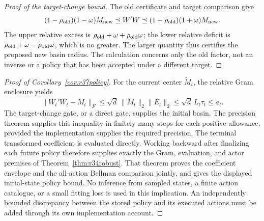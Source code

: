 \documentclass[ecta,nameyear,draft]{econsocart}
\theoremstyle{definition}
\theoremstyle{remark}
\begin{document}
\begin{proof}[Proof of the target-change bound]
The old certificate and target comparison give
\[
 (1-\rho_{\rm old})(1-\omega)M_{\rm new}
 \preceq W'W\preceq
 (1+\rho_{\rm old})(1+\omega)M_{\rm new}.
\]
The upper relative excess is $\rho_{\rm old}+\omega+
\rho_{\rm old}\omega$; the lower relative deficit is
$\rho_{\rm old}+\omega-\rho_{\rm old}\omega$, which is no greater.
The larger quantity thus certifies the proposed new basin radius. The
calculation concerns only the old factor, not an inverse or a policy that
has been accepted under a different target.
\end{proof}

\begin{proof}[Proof of Corollary~\ref{cor:r37policy}]
For the current center $\widetilde M_t$, the relative Gram enclosure yields
\[
 \|W_t'W_t-\widetilde M_t\|_F
 \leq\sqrt d\,\|\widetilde M_t\|_2\|E_t\|_2
 \leq\sqrt d\,L_t\tau_t\leq a_t.
\]
The target-change gate, or a direct gate, supplies the initial basin. The
precision theorem supplies this inequality in finitely many steps for each
positive allowance, provided the implementation supplies the required
precision. The terminal transformed coefficient is evaluated directly.
Working backward after finalizing each future policy therefore supplies
exactly the Gram, evaluation, and actor premises of
Theorem~\ref{thm:r34robust}. That theorem proves the coefficient envelope
and the all-action Bellman comparison jointly, and gives the displayed
initial-state policy bound. No inference from sampled states, a finite
action catalogue, or a small fitting loss is used in this implication.
An independently bounded discrepancy between the stored policy and its
executed actions must be added through its own implementation account.
\end{proof}
\end{document}
